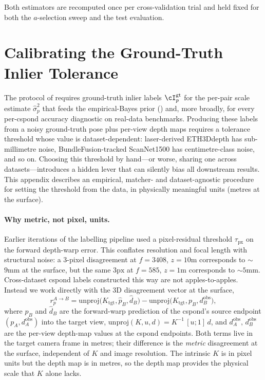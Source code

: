 \documentclass{article}
\newcommand{\mname}[1]{\texorpdfstring{#1\xspace}{#1}}
\newcommand{\ethd}{\mname{ETH3D}}
\begin{document}
Both estimators are recomputed once per cross-validation trial
and held fixed for both the $a$-selection sweep and the test
evaluation.

\iffalse  %
\section{Calibrating the Ground-Truth Inlier Tolerance}
\label{sec:supp-gt-calibration}

The protocol of  requires
ground-truth inlier labels $\cI_p^{\mathrm{gt}}$ for the per-pair
scale estimate $\hat\sigma^2_p$ that feeds the empirical-Bayes
prior () and, more
broadly, for every per-cspond accuracy diagnostic on
real-data benchmarks.  Producing these labels from a noisy
ground-truth pose plus per-view depth maps requires a tolerance
threshold whose value is dataset-dependent: laser-derived
\ethd depth has sub-millimetre noise, BundleFusion-tracked
ScanNet1500 has centimetre-class noise, and so on.  Choosing
this threshold by hand---or worse, sharing one across
datasets---introduces a hidden lever that can silently bias all
downstream results.  This appendix describes an empirical,
matcher- and dataset-agnostic procedure for setting the threshold
from the data, in physically meaningful units (metres at the
surface).

\paragraph{Why metric, not pixel, units.}
Earlier iterations of the labelling pipeline used a pixel-residual
threshold $\tau_{\mathrm{px}}$ on the forward depth-warp error.
This conflates resolution and focal length with structural
noise: a 3-pixel disagreement at $f{=}3408$, $z{=}10\text{m}$
corresponds to $\sim$$9\text{mm}$ at the surface, but the same
		$3\text{px}$ at $f{=}585$, $z{=}1\text{m}$ corresponds to
		$\sim$$5\text{mm}$.  Cross-dataset cspond labels constructed
		this way are not apples-to-apples.  Instead we work directly with
		the 3D disagreement vector at the surface,
		\begin{equation}
			\label{eq:gt-residual}
			r^{A\to B}_p
			= \mathrm{unproj}\bigl(K_{\mathrm{tgt}}, \hat p_B, \hat d_B\bigr)
			- \mathrm{unproj}\bigl(K_{\mathrm{tgt}}, p_B,      d^{\mathrm{obs}}_B\bigr),
		\end{equation}
		where $\hat p_B$ and $\hat d_B$ are the forward-warp prediction
		of the cspond's source endpoint $(p_A, d^{\mathrm{obs}}_A)$ into
		the target view, $\mathrm{unproj}(K, u, d) = K^{-1}\,[u; 1]\,d$, and
	$d^{\mathrm{obs}}_A,\,d^{\mathrm{obs}}_B$ are the per-view
		depth-map values at the cspond endpoints.  Both terms live in the
		target camera frame in metres; their difference is the
		\emph{metric} disagreement at the surface, independent of
	$K$ and image resolution.  The intrinsic $K$ is in pixel units
		but the depth map is in metres, so the depth map provides the
		physical scale that $K$ alone lacks.
\end{document}
